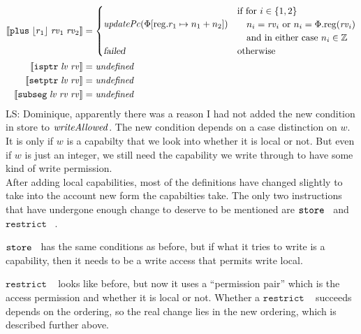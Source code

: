 \documentclass{article}
\newcommand{\update}[2]{[#1 \mapsto #2]}
\newcommand{\sem}[1]{\left\llbracket #1 \right\rrbracket}
\newcommand{\undefined}{\mathit{undefined}}
\newcommand\lau[1]{{\color{purple} \sf \footnotesize {LS: #1}}\\}
\newcommand{\var}[1]{\mathit{#1}}
\newcommand{\rv}{\var{rv}}
\newcommand{\lv}{\var{lv}}
\newcommand{\plainproj}[1]{\mathrm{#1}}
\newcommand{\memreg}[1][\Phi]{#1.\plainproj{reg}}
\newcommand{\updateReg}[3][\Phi]{#1\update{\plainproj{reg}.#2}{#3}}
\newcommand{\failed}{\textsl{failed}}
\newcommand{\plainfun}[2]{
  \ifthenelse{\equal{#2}{}}
             {\mathit{#1}}
             {\mathit{#1}(#2)}
}
\newcommand{\writeAllowed}[1]{\plainfun{writeAllowed}{#1}}
\newcommand{\stdUpdatePc}[1]{\plainfun{updatePc}{#1}}
\newcommand{\ints}{\mathbb{Z}}
\newcommand{\refreg}[1]{\lfloor #1 \rfloor}
\newcommand{\zinstr}[1]{\mathtt{#1}}
\newcommand{\twoinstr}[3]{\zinstr{#1} \; #2 \; #3}
\newcommand{\isptr}[2]{\twoinstr{isptr}{#1}{#2}}
\newcommand{\setptr}[2]{\twoinstr{setptr}{#1}{#2}}
\newcommand{\store}[2]{\twoinstr{store}{#1}{#2}}
\newcommand{\threeinstr}[4]{\zinstr{#1} \; #2 \; #3 \; #4}
\newcommand{\restrict}[3]{\threeinstr{restrict}{#1}{#2}{#3}}
\newcommand{\subseg}[3]{\threeinstr{subseg}{#1}{#2}{#3}}
\newcommand{\plus}[3]{\threeinstr{plus}{#1}{#2}{#3}}
\begin{document}
\begin{align*}
  \sem{\plus{\refreg{r_1}}{\rv_1}{\rv_2}}               & =
                                                          \begin{cases}
                                                            \stdUpdatePc{\updateReg{r_1}{n_1+n_2}} &
                                                            \arraycolsep=0pt
                                                            \begin{array}{l}
                                                              \text{if for $i \in \{1,2\}$}\\
                                                              \quad\text{$n_i = \rv_i$ or $n_i = \memreg(\rv_i)$}\\
                                                              \quad\text{and in either case $n_i \in \ints$}
                                                            \end{array}\\
                                                            \failed & \text{otherwise}
                                                          \end{cases}\\
  \sem{\isptr{\lv}{\rv}} & = \undefined \\ 
  \sem{\setptr{\lv}{\rv}} & = \undefined \\ 
  \sem{\subseg{\lv}{\rv}{\rv}} & = \undefined 
\end{align*}
\lau{Dominique, apparently there was a reason I had not added the new condition in store to $\writeAllowed{}$. The new condition depends on a case distinction on $w$. It is only if $w$ is a capabilty that we look into whether it is local or not. But even if $w$ is just an integer, we still need the capability we write through to have some kind of write permission.}

After adding local capabilities, most of the definitions have changed slightly to take into the account new form the capabilties take. The only two instructions that have undergone enough change to deserve to be mentioned are $\store{}$ and $\restrict{}{}{}$. 

$\store{}$ has the same conditions as before, but if what it tries to write is a capability, then it needs to be a write access that permits write local.

$\restrict{}{}{}$ looks like before, but now it uses a ``permission pair'' which is the access permission and whether it is local or not. Whether a $\restrict{}{}{}$ succeeds depends on the ordering, so the real change lies in the new ordering, which is described further above.
\end{document}
